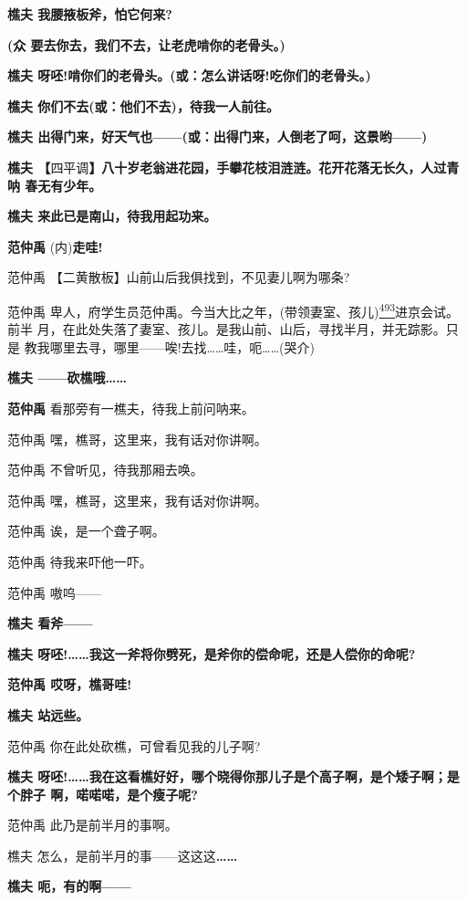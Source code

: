 \textbf{樵夫 我腰掖板斧，怕它何来?}

\textbf{(众 要去你去，我们不去，让老虎啃你的老骨头。)}

\textbf{樵夫 呀呸!啃你们的老骨头。(或：怎么讲话呀!吃你们的老骨头。)}

\textbf{樵夫 你们不去(或：他们不去)，待我一人前往。}

\textbf{樵夫
出得门来，好天气也------(或：出得门来，人倒老了呵，这景哟------)}

\textbf{樵夫
【}四平调\textbf{】八十岁老翁进花园，手攀花枝泪涟涟。花开花落无长久，人过青呐
春无有少年。}

\textbf{樵夫 来此已是南山，待我用起功来。}

\textbf{范仲禹} (内)\textbf{走哇!}

范仲禹 【二黄散板】山前山后我俱找到，不见妻儿啊为哪条?

范仲禹
卑人，府学生员范仲禹。今当大比之年，(带领妻室、孩儿)\protect\hyperlink{fn493}{\textsuperscript{493}}进京会试。前半
月，在此处失落了妻室、孩儿。是我山前、山后，寻找半月，并无踪影。只是
教我哪里去寻，哪里------唉!去找\ldots{}\ldots{}哇，呃\ldots{}\ldots{}(哭介)

\textbf{樵夫 ------砍樵哦\ldots{}\ldots{}}

\textbf{范仲禹} 看那旁有一樵夫，待我上前问呐来。

范仲禹 嘿，樵哥，这里来，我有话对你讲啊。

范仲禹 不曾听见，待我那厢去唤。

范仲禹 嘿，樵哥，这里来，我有话对你讲啊。

范仲禹 诶，是一个聋子啊。

范仲禹 待我来吓他一吓。

范仲禹 嗷呜------

\textbf{樵夫 看斧------}

\textbf{樵夫
呀呸!\ldots{}\ldots{}我这一斧将你劈死，是斧你的偿命呢，还是人偿你的命呢?}

\textbf{范仲禹 哎呀，樵哥哇!}

\textbf{樵夫 站远些。}

范仲禹 你在此处砍樵，可曾看见我的儿子啊?

\textbf{樵夫
呀呸!\ldots{}\ldots{}我在这看樵好好，哪个晓得你那儿子是个高子啊，是个矮子啊；是个胖子
啊，喏喏喏，是个瘦子呢?}

范仲禹 此乃是前半月的事啊。

樵夫 怎么，是前半月的事------这这这\textbf{\ldots{}\ldots{}}

\textbf{樵夫 呃，有的啊------}

